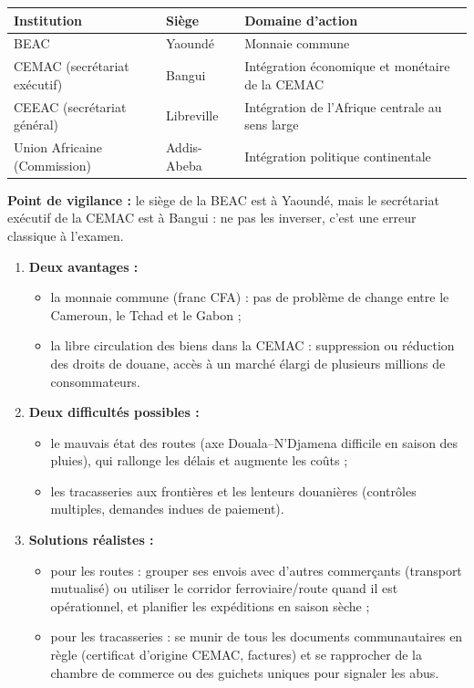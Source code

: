 \documentclass[11pt]{article}
\newcommand{\cle}[1]{{\popxbold\color{popdark}#1}}
\begin{document}
\begin{corrige}
\begin{center}
\begin{tabularx}{\linewidth}{|l|X|X|}\hline
\rowcolor{popblueL} \textbf{Institution} & \textbf{Siège} & \textbf{Domaine d'action} \\ \hline
BEAC & Yaoundé & Monnaie commune \\ \hline
CEMAC (secrétariat exécutif) & Bangui & Intégration économique et monétaire de la CEMAC \\ \hline
CEEAC (secrétariat général) & Libreville & Intégration de l'Afrique centrale au sens large \\ \hline
Union Africaine (Commission) & Addis-Abeba & Intégration politique continentale \\ \hline
\end{tabularx}
\end{center}
\textbf{Point de vigilance :} le siège de la BEAC est à Yaoundé, mais le secrétariat exécutif de la CEMAC est à Bangui : ne pas les inverser, c'est une erreur classique à l'examen.
\end{corrige}

\begin{corrige}
\begin{enumerate}
\item \textbf{Deux avantages :}
\begin{itemize}
\item la \cle{monnaie commune} (franc CFA) : pas de problème de change entre le Cameroun, le Tchad et le Gabon ;
\item la \cle{libre circulation des biens} dans la CEMAC : suppression ou réduction des droits de douane, accès à un marché élargi de plusieurs millions de consommateurs.
\end{itemize}
\item \textbf{Deux difficultés possibles :}
\begin{itemize}
\item le mauvais état des routes (axe Douala--N'Djamena difficile en saison des pluies), qui rallonge les délais et augmente les coûts ;
\item les tracasseries aux frontières et les lenteurs douanières (contrôles multiples, demandes indues de paiement).
\end{itemize}
\item \textbf{Solutions réalistes :}
\begin{itemize}
\item pour les routes : grouper ses envois avec d'autres commerçants (transport mutualisé) ou utiliser le corridor ferroviaire/route quand il est opérationnel, et planifier les expéditions en saison sèche ;
\item pour les tracasseries : se munir de tous les documents communautaires en règle (certificat d'origine CEMAC, factures) et se rapprocher de la chambre de commerce ou des guichets uniques pour signaler les abus.
\end{itemize}
\end{enumerate}
\end{corrige}
\end{document}
